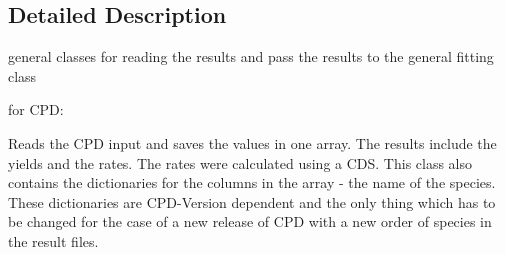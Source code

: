 \subsection{\-Detailed \-Description}
general classes for reading the results and pass the results to the general fitting class 

for \-C\-P\-D\-: \begin{DoxyVerb}Reads the CPD input and saves the values in one array. The results include the yields and the rates. The rates were calculated using a CDS. This class also contains the dictionaries for the columns in the array - the name of the species. These dictionaries are CPD-Version dependent and the only thing which has to be changed for the case of a new release of CPD with a new order of species in the result files.\end{DoxyVerb}
 

